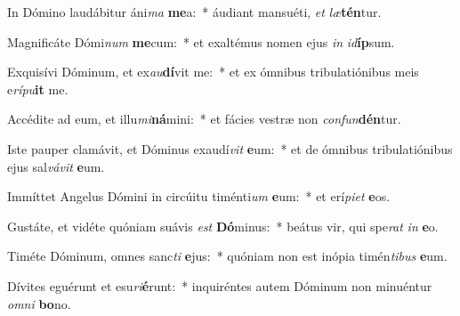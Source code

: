 \item In Dómino laudábitur áni\textit{ma} \textbf{me}a:~* áudiant mansuéti, \textit{et} \textit{læ}\textbf{tén}tur.
\item Magnificáte Dómi\textit{num} \textbf{me}cum:~* et exaltémus nomen ejus \textit{in} \textit{id}\textbf{íp}sum.
\item Exquisívi Dóminum, et ex\textit{au}\textbf{dí}vit me:~* et ex ómnibus tribulatiónibus meis e\textit{rí}\textit{pu}\textbf{it} me.
\item Accédite ad eum, et illu\textit{mi}\textbf{ná}mini:~* et fácies vestræ non \textit{con}\textit{fun}\textbf{dén}tur.
\item Iste pauper clamávit, et Dóminus exaudí\textit{vit} \textbf{e}um:~* et de ómnibus tribulatiónibus ejus sal\textit{vá}\textit{vit} \textbf{e}um.
\item Immíttet Angelus Dómini in circúitu timénti\textit{um} \textbf{e}um:~* et erí\textit{pi}\textit{et} \textbf{e}os.
\item Gustáte, et vidéte quóniam suávis \textit{est} \textbf{Dó}minus:~* beátus vir, qui spe\textit{rat} \textit{in} \textbf{e}o.
\item Timéte Dóminum, omnes sanc\textit{ti} \textbf{e}jus:~* quóniam non est inópia timén\textit{ti}\textit{bus} \textbf{e}um.
\item Dívites eguérunt et esu\textit{ri}\textbf{é}runt:~* inquiréntes autem Dóminum non minuéntur \textit{om}\textit{ni} \textbf{bo}no.
